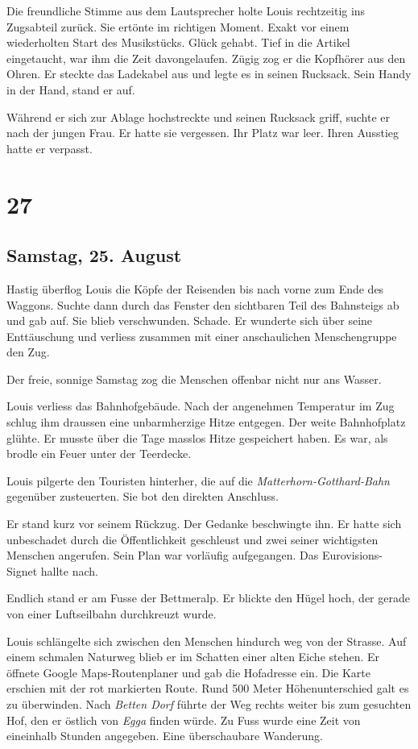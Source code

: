 Die freundliche Stimme aus dem Lautsprecher holte Louis rechtzeitig ins
Zugsabteil zurück. Sie ertönte im richtigen Moment. Exakt vor einem
wiederholten Start des Musikstücks. Glück gehabt. Tief in die Artikel
eingetaucht, war ihm die Zeit davongelaufen. Zügig zog er die Kopfhörer
aus den Ohren. Er steckte das Ladekabel aus und legte es in seinen
Rucksack. Sein Handy in der Hand, stand er auf.

Während er sich zur Ablage hochstreckte und seinen Rucksack griff,
suchte er nach der jungen Frau. Er hatte sie vergessen. Ihr Platz war
leer. Ihren Ausstieg hatte er verpasst.

\chapter{27}\label{section-26}

\section{Samstag, 25. August}\label{samstag-25.-august}

Hastig überflog Louis die Köpfe der Reisenden bis nach vorne zum Ende
des Waggons. Suchte dann durch das Fenster den sichtbaren Teil des
Bahnsteigs ab und gab auf. Sie blieb verschwunden. Schade. Er wunderte
sich über seine Enttäuschung und verliess zusammen mit einer
anschaulichen Menschengruppe den Zug.

Der freie, sonnige Samstag zog die Menschen offenbar nicht nur ans
Wasser.

Louis verliess das Bahnhofgebäude. Nach der angenehmen Temperatur im Zug
schlug ihm draussen eine unbarmherzige Hitze entgegen. Der weite
Bahnhofplatz glühte. Er musste über die Tage masslos Hitze gespeichert
haben. Es war, als brodle ein Feuer unter der Teerdecke.

Louis pilgerte den Touristen hinterher, die auf die
\emph{Matterhorn-Gotthard-Bahn} gegenüber zusteuerten. Sie bot den
direkten Anschluss.

Er stand kurz vor seinem Rückzug. Der Gedanke beschwingte ihn. Er hatte
sich unbeschadet durch die Öffentlichkeit geschleust und zwei seiner
wichtigsten Menschen angerufen. Sein Plan war vorläufig aufgegangen. Das
Eurovisions-Signet hallte nach.

Endlich stand er am Fusse der Bettmeralp. Er blickte den Hügel hoch, der
gerade von einer Luftseilbahn durchkreuzt wurde.

Louis schlängelte sich zwischen den Menschen hindurch weg von der
Strasse. Auf einem schmalen Naturweg blieb er im Schatten einer alten
Eiche stehen. Er öffnete Google Maps-Routenplaner und gab die Hofadresse
ein. Die Karte erschien mit der rot markierten Route. Rund 500 Meter
Höhenunterschied galt es zu überwinden. Nach \emph{Betten Dorf} führte
der Weg rechts weiter bis zum gesuchten Hof, den er östlich von
\emph{Egga} finden würde. Zu Fuss wurde eine Zeit von eineinhalb Stunden
angegeben. Eine überschaubare Wanderung.

